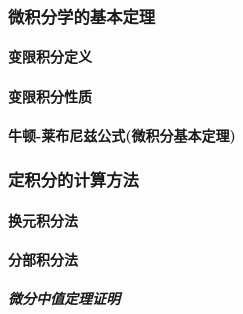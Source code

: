 \documentclass[
]{article}
\begin{document}
\hypertarget{ux5faeux79efux5206ux5b66ux7684ux57faux672cux5b9aux7406}{%
\subsubsection{微积分学的基本定理}\label{ux5faeux79efux5206ux5b66ux7684ux57faux672cux5b9aux7406}}

\hypertarget{ux53d8ux9650ux79efux5206ux5b9aux4e49}{%
\paragraph{变限积分定义}\label{ux53d8ux9650ux79efux5206ux5b9aux4e49}}

\hypertarget{ux53d8ux9650ux79efux5206ux6027ux8d28}{%
\paragraph{变限积分性质}\label{ux53d8ux9650ux79efux5206ux6027ux8d28}}

\hypertarget{ux725bux987f-ux83b1ux5e03ux5c3cux5179ux516cux5f0fux5faeux79efux5206ux57faux672cux5b9aux7406}{%
\paragraph{牛顿-莱布尼兹公式(微积分基本定理)}\label{ux725bux987f-ux83b1ux5e03ux5c3cux5179ux516cux5f0fux5faeux79efux5206ux57faux672cux5b9aux7406}}

\hypertarget{ux5b9aux79efux5206ux7684ux8ba1ux7b97ux65b9ux6cd5}{%
\subsubsection{定积分的计算方法}\label{ux5b9aux79efux5206ux7684ux8ba1ux7b97ux65b9ux6cd5}}

\hypertarget{ux6362ux5143ux79efux5206ux6cd5-2}{%
\paragraph{换元积分法}\label{ux6362ux5143ux79efux5206ux6cd5-2}}

\hypertarget{ux5206ux90e8ux79efux5206ux6cd5-2}{%
\paragraph{分部积分法}\label{ux5206ux90e8ux79efux5206ux6cd5-2}}

\hypertarget{ux5faeux5206ux4e2dux503cux5b9aux7406ux8bc1ux660e}{%
\subparagraph{微分中值定理证明}\label{ux5faeux5206ux4e2dux503cux5b9aux7406ux8bc1ux660e}}
\end{document}
